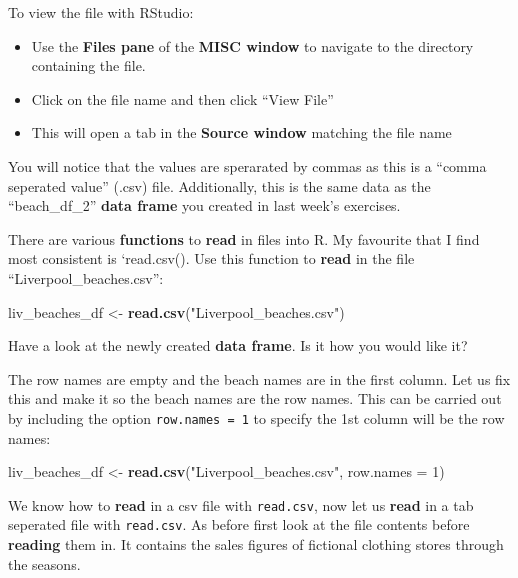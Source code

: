 \documentclass[]{book}
\newenvironment{Shaded}{\begin{snugshade}}{\end{snugshade}}
\newcommand{\KeywordTok}[1]{\textcolor[rgb]{0.13,0.29,0.53}{\textbf{#1}}}
\newcommand{\DataTypeTok}[1]{\textcolor[rgb]{0.13,0.29,0.53}{#1}}
\newcommand{\DecValTok}[1]{\textcolor[rgb]{0.00,0.00,0.81}{#1}}
\newcommand{\StringTok}[1]{\textcolor[rgb]{0.31,0.60,0.02}{#1}}
\newcommand{\NormalTok}[1]{#1}
\providecommand{\tightlist}{%
  \setlength{\itemsep}{0pt}\setlength{\parskip}{0pt}}
\begin{document}
To view the file with RStudio:

\begin{itemize}
\tightlist
\item
  Use the \textbf{Files pane} of the \textbf{MISC window} to navigate to
  the directory containing the file.
\item
  Click on the file name and then click ``View File''
\item
  This will open a tab in the \textbf{Source window} matching the file
  name
\end{itemize}

You will notice that the values are sperarated by commas as this is a
``comma seperated value'' (.csv) file. Additionally, this is the same
data as the ``beach\_df\_2'' \textbf{data frame} you created in last
week's exercises.

There are various \textbf{functions} to \textbf{read} in files into R.
My favourite that I find most consistent is `read.csv(). Use this
function to \textbf{read} in the file ``Liverpool\_beaches.csv'':

\begin{Shaded}
\begin{Highlighting}[]
\NormalTok{liv_beaches_df <-}\StringTok{ }\KeywordTok{read.csv}\NormalTok{(}\StringTok{"Liverpool_beaches.csv"}\NormalTok{)}
\end{Highlighting}
\end{Shaded}

Have a look at the newly created \textbf{data frame}. Is it how you
would like it?

The row names are empty and the beach names are in the first column. Let
us fix this and make it so the beach names are the row names. This can
be carried out by including the option \texttt{row.names\ =\ 1} to
specify the 1st column will be the row names:

\begin{Shaded}
\begin{Highlighting}[]
\NormalTok{liv_beaches_df <-}\StringTok{ }\KeywordTok{read.csv}\NormalTok{(}\StringTok{"Liverpool_beaches.csv"}\NormalTok{, }\DataTypeTok{row.names =} \DecValTok{1}\NormalTok{)}
\end{Highlighting}
\end{Shaded}

We know how to \textbf{read} in a csv file with \texttt{read.csv}, now
let us \textbf{read} in a tab seperated file with \texttt{read.csv}. As
before first look at the file contents before \textbf{reading} them in.
It contains the sales figures of fictional clothing stores through the
seasons.
\end{document}
